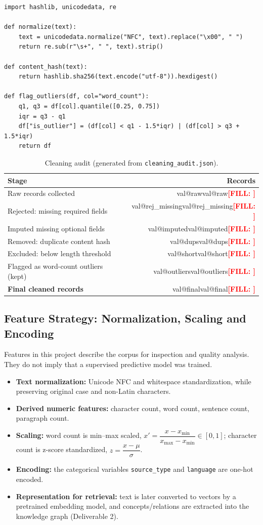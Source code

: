 \documentclass[11pt,a4paper]{article}
\makeatletter
\newcommand{\todo}[1]{\textcolor{red}{\textbf{[FILL: #1]}}}
\newcommand{\val}[1]{\ifcsname val@#1\endcsname\csname val@#1\endcsname\else\todo{\detokenize{#1}}\fi}
\makeatother
\begin{document}
\begin{lstlisting}[caption={Core of the cleaning step (excerpt; full script in the repository).}]
import hashlib, unicodedata, re

def normalize(text):
    text = unicodedata.normalize("NFC", text).replace("\x00", " ")
    return re.sub(r"\s+", " ", text).strip()

def content_hash(text):
    return hashlib.sha256(text.encode("utf-8")).hexdigest()

def flag_outliers(df, col="word_count"):
    q1, q3 = df[col].quantile([0.25, 0.75])
    iqr = q3 - q1
    df["is_outlier"] = (df[col] < q1 - 1.5*iqr) | (df[col] > q3 + 1.5*iqr)
    return df
\end{lstlisting}

\begin{table}[H]
\centering
\caption{Cleaning audit (generated from \texttt{cleaning\_audit.json}).}
\begin{tabular}{p{7cm}r}
\toprule
\textbf{Stage} & \textbf{Records} \\
\midrule
Raw records collected & \val{raw} \\
Rejected: missing required fields & \val{rej_missing} \\
Imputed missing optional fields & \val{imputed} \\
Removed: duplicate content hash & \val{dups} \\
Excluded: below length threshold & \val{short} \\
Flagged as word-count outliers (kept) & \val{outliers} \\
\textbf{Final cleaned records} & \val{final} \\
\bottomrule
\end{tabular}
\end{table}

\subsection{Feature Strategy: Normalization, Scaling and Encoding}
Features in this project describe the corpus for inspection and quality analysis. They do not imply that a supervised predictive model was trained.
\begin{itemize}[nosep]
  \item \textbf{Text normalization:} Unicode NFC and whitespace standardization, while preserving original case and non-Latin characters.
  \item \textbf{Derived numeric features:} character count, word count, sentence count, paragraph count.
  \item \textbf{Scaling:} word count is min--max scaled, $x' = \dfrac{x-x_{\min}}{x_{\max}-x_{\min}}\in[0,1]$; character count is z-score standardized, $z=\dfrac{x-\mu}{\sigma}$.
  \item \textbf{Encoding:} the categorical variables \texttt{source\_type} and \texttt{language} are one-hot encoded.
  \item \textbf{Representation for retrieval:} text is later converted to vectors by a pretrained embedding model, and concepts/relations are extracted into the knowledge graph (Deliverable 2).
\end{itemize}
\end{document}
